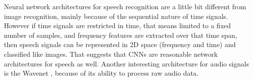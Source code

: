 Neural network architectures for speech recognition are a little bit different from image recognition, mainly because of the sequential nature of time signals.
However if time signals are restricted in time, that means limited to a fixed number of samples, and frequency features are extracted over that time span, then speech signals can be represented in 2D space (frequency and time) and classified like images.
That suggests that CNNs are reasonable network architectures for speech as well.
Another interesting architecture for audio signals is the Wavenet \cite{Oord2016}, because of its ability to process raw audio data.


